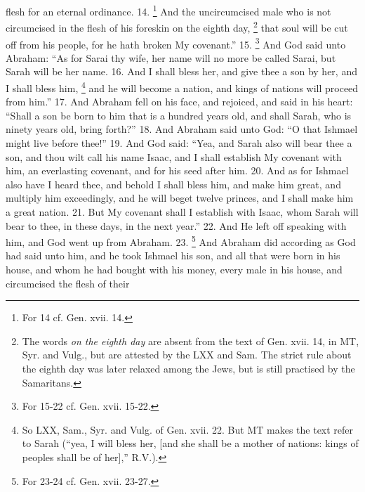 flesh for an eternal ordinance. 14. \footnote{For 14 cf. Gen. xvii. 14.} And the uncircumcised male who is not circumcised in the flesh of his foreskin on the eighth day, \footnote{The words \emph{on the eighth day} are absent from the text of Gen. xvii. 14, in MT, Syr. and Vulg., but are attested by the LXX and Sam. The strict rule about the eighth day was later relaxed among the Jews, but is still practised by the Samaritans.} that soul will be cut off from his people, for he hath broken My covenant.'' 15. \footnote{For 15-22 cf. Gen. xvii. 15-22.} And God said unto Abraham: ``As for Sarai thy wife, her name will no more be called Sarai, but Sarah will be her name. 16. And I shall bless her, and give thee a son by her, and I shall bless him, \footnote{So LXX, Sam., Syr. and Vulg. of Gen. xvii. 22. But MT makes the text refer to Sarah (``yea, I will bless her, [and she shall be a mother of nations: kings of peoples shall be of her],'' R.V.).} and he will become a nation, and kings of nations will proceed from him.'' 17. And Abraham fell on his face, and rejoiced, and said in his heart: ``Shall a son be born to him that is a hundred years old, and shall Sarah, who is ninety years old, bring forth?'' 18. And Abraham said unto God: ``O that Ishmael might live before thee!'' 19. And God said: ``Yea, and Sarah also will bear thee a son, and thou wilt call his name Isaac, and I shall establish My covenant with him, an everlasting covenant, and for his seed after him. 20. And as for Ishmael also have I heard thee, and behold I shall bless him, and make him great, and multiply him exceedingly, and he will beget twelve princes, and I shall make him a great nation. 21. But My covenant shall I establish with Isaac, whom Sarah will bear to thee, in these days, in the next year.'' 22. And He left off speaking with him, and God went up from Abraham. 23. \footnote{For 23-24 cf. Gen. xvii. 23-27.} And Abraham did according as God had said unto him, and he took Ishmael his son, and all that were born in his house, and whom he had bought with his money, every male in his house, and circumcised the flesh of their

